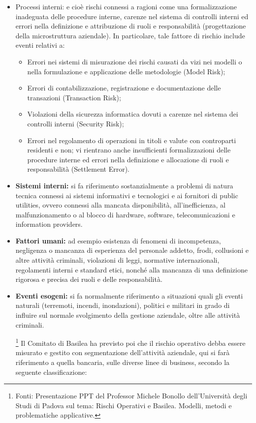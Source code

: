 \documentclass[titlepage]{article}
\begin{document}
\begin{itemize}
\item 	Processi interni: e cioè rischi connessi a ragioni come una formalizzazione inadeguata delle procedure interne, carenze nel sistema di controlli interni ed errori nella definizione e attribuzione di ruoli e responsabilità (progettazione della microstruttura aziendale). In particolare, tale fattore di rischio include eventi relativi a:
\begin{itemize}
\item	Errori nei sistemi di misurazione dei rischi causati da vizi nei modelli o nella formulazione e applicazione delle metodologie (Model Risk);
\item	Errori di contabilizzazione, registrazione e documentazione delle transazioni (Transaction Risk);
\item	Violazioni della sicurezza informatica dovuti a carenze nel sistema dei controlli interni (Security Risk);
\item	Errori nel regolamento di operazioni in titoli e valute con controparti residenti e non; vi rientrano anche insufficienti formalizzazioni delle procedure interne ed errori nella definizione e allocazione di ruoli e responsabilità (Settlement Error).
\end{itemize}
\item	\textbf{Sistemi interni:} si fa riferimento sostanzialmente a problemi di natura tecnica connessi ai sistemi informativi e tecnologici e ai fornitori di public utilities, ovvero connessi alla mancata disponibilità, all’inefficienza, al malfunzionamento o al blocco di hardware, software, telecomunicazioni e information providers.

\item	\textbf{Fattori umani:} ad esempio esistenza di fenomeni di incompetenza, negligenza o mancanza di esperienza del personale addetto, frodi, collusioni e altre attività criminali, violazioni di leggi, normative internazionali, regolamenti interni e standard etici, nonché alla mancanza di una definizione rigorosa e precisa dei ruoli e delle responsabilità. 

\item	\textbf{Eventi esogeni:} si fa normalmente riferimento a situazioni quali gli eventi naturali (terremoti, incendi, inondazioni), politici e militari in grado di influire sul normale svolgimento della gestione aziendale, oltre alle attività criminali.

\footnote{Fonti: Presentazione PPT del Professor Michele Bonollo dell’Università degli Studi di Padova sul tema: Rischi Operativi e Basilea. Modelli, metodi e problematiche applicative.} Il Comitato di Basilea ha previsto poi che il rischio operativo debba essere misurato e gestito con segmentazione dell’attività aziendale, qui si farà riferimento a quella bancaria, sulle diverse linee di business, secondo la seguente classificazione:
 \begin{itemize}
 	


\end{itemize}
\end{itemize}
\end{document}
